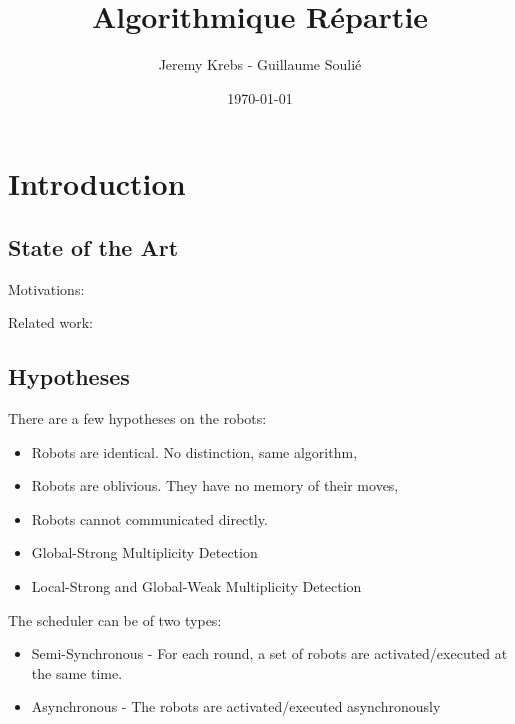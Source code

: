 \documentclass{beamer}
\title{Algorithmique Répartie}
\author{Jeremy Krebs - Guillaume Soulié}
\institute{Université Paris Saclay}
\date{\today}
\begin{document}
\begin{frame}
\titlepage
\end{frame}

\begin{frame}
  \tableofcontents
\end{frame}      



\section{Introduction}
\subsection{State of the Art}
\begin{frame}
	Motivations:
\end{frame}

\begin{frame}
	Related work:
\end{frame}
\subsection{Hypotheses}
\begin{frame}
	There are a few hypotheses on the robots:
	\begin{itemize}
		\item<2-> Robots are identical. No distinction, same algorithm,
		\item<3-> Robots are oblivious. They have no memory of their moves,
		\item<4-> Robots cannot communicated directly.
	\end{itemize}
	
	\begin{itemize}
		\item<6-> Global-Strong Multiplicity Detection
		\item<7-> Local-Strong and Global-Weak Multiplicity Detection
	\end{itemize}
\end{frame}
\begin{frame}
	The scheduler can be of two types:
	\begin{itemize}
		\item<2->[SSYNC] Semi-Synchronous - For each round, a set of robots are activated/executed at the same time.
		\item<3->[ASYNC] Asynchronous - The robots are activated/executed asynchronously
	\end{itemize}
\end{frame}
\end{document}
